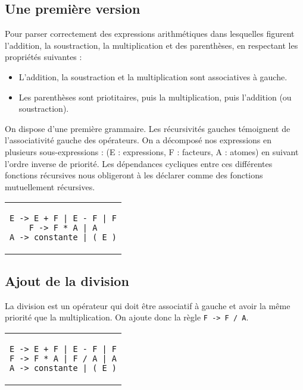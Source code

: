 \documentclass[11pt]{article}
\begin{document}
\subsection{Une première version}
Pour parser correctement des expressions arithmétiques dans lesquelles figurent l'addition, la soustraction, la multiplication et des parenthèses, en respectant les propriétés suivantes :
\begin{itemize}
\item L'addition, la soustraction et la multiplication sont associatives à gauche.
\item Les parenthèses sont priotitaires, puis la multiplication, puis l'addition (ou soustraction).
\end{itemize}

On dispose d'une première grammaire. Les récursivités gauches témoignent de l'associativité gauche des opérateurs. On a décomposé nos expressions en plusieurs sous-expressions : (E : expressions, F : facteurs, A : atomes) en suivant l'ordre inverse de priorité. Les dépendances cycliques entre ces différentes fonctions récursives nous obligeront à les déclarer comme des fonctions mutuellement récursives.

\begin{center}
\begin{tabular}{c}
\begin{lstlisting}
E -> E + F | E - F | F
F -> F * A | A
A -> constante | ( E )
\end{lstlisting}
\end{tabular}
\end{center}

\subsection{Ajout de la division}
La division est un opérateur qui doit être associatif à gauche et avoir la même priorité que la multiplication. On ajoute donc la règle \texttt{F -> F / A}.
\begin{center}
\begin{tabular}{c}
\begin{lstlisting}
E -> E + F | E - F | F
F -> F * A | F / A | A
A -> constante | ( E )
\end{lstlisting}
\end{tabular}
\end{center}
\end{document}
